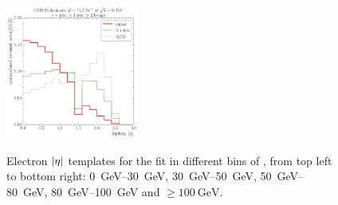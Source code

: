 \begin{figure}[!htbp]
    \hspace*{\fill} \\
    \hspace*{\fill}
    {\includegraphics[width=0.39\textwidth]{measurement/MT/central/fit_templates/electron_templates_bin_100-inf}}
    \hspace*{\fill}
    \caption{Electron $\lvert \eta \rvert$ templates for the fit in different bins of \MT,
    from top left to bottom right: \SIrange{0}{30}{\GeV}, \SIrange{30}{50}{\GeV},
    \SIrange{50}{80}{\GeV}, \SIrange{80}{100}{\GeV} and $\geq \SI{100}{\GeV}$.}
    \label{fig:fit_tempaltes_MT_electron}
\end{figure}


